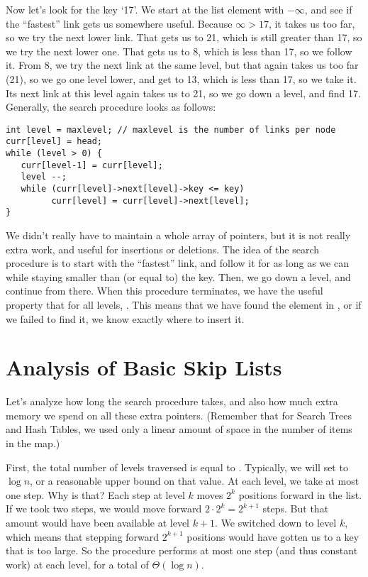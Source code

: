 Now let's look for the key `17'. We start at the list element with
$-\infty$, and see if the ``fastest'' link gets us somewhere
useful. Because $\infty > 17$, it takes us too far, so we try the next
lower link. That gets us to 21, which is still greater than 17, so we
try the next lower one. That gets us to 8, which is less than 17, so
we follow it. From 8, we try the next link at the same level, but that
again takes us too far (21), so we go one level lower, and get to 13,
which is less than 17, so we take it. Its next link at this level
again takes us to 21, so we go down a level, and find 17.
Generally, the search procedure looks as follows:

\begin{verbatim}
int level = maxlevel; // maxlevel is the number of links per node
curr[level] = head;
while (level > 0) {
   curr[level-1] = curr[level];
   level --;
   while (curr[level]->next[level]->key <= key)
         curr[level] = curr[level]->next[level];
}
\end{verbatim}

We didn't really have to maintain a whole array of 
pointers, but it is not really extra work, and useful for insertions
or deletions. The idea of the search procedure is to start with the
``fastest'' link, and follow it for as long as we can while staying
smaller than (or equal to) the key. Then, we go down a level, and
continue from there. When this procedure terminates, we have the
useful property that for all levels, 
.
This means that we have found the element in , or if we
failed to find it, we know exactly where to insert it.

\section{Analysis of Basic Skip Lists}
Let's analyze how long the search procedure takes, and also how much
extra memory we spend on all these extra pointers. 
(Remember that for Search Trees and Hash Tables, we used only a linear
amount of space in the number of items in the map.)

First, the total number of levels traversed is equal to
. Typically, we will set  to $\log n$,
or a reasonable upper bound on that value. At each level, we take at
most one step. Why is that? Each step at level $k$ moves $2^k$
positions forward in the list. If we took two steps, we would move
forward $2 \cdot 2^k = 2^{k+1}$ steps. But that amount would have been
available at level $k+1$. We switched down to level $k$, which means
that stepping forward $2^{k+1}$ positions would have gotten us to a
key that is too large. So the procedure performs at most one step (and
thus constant work) at each level, for a total of $\Theta(\log n)$.

